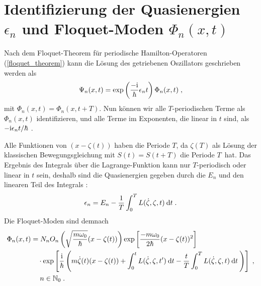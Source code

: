       \section{\texorpdfstring{Identifizierung der Quasienergien $\epsilon_n$ und Floquet-Moden $\Phi_n(x,t)$}{Identifizierung der Quasienergien epsilon_n und Floquet-Moden Phi_n(x,t)}}
        Nach dem Floquet-Theorem für periodische Hamilton-Operatoren (\ref{floquet_theorem}) kann die Lösung des getriebenen Oszillators geschrieben werden als
        \begin{equation}
          \Psi_n(x,t) = \exp\left(\frac{-\text i}{\hbar}\epsilon_nt\right)\Phi_n(x,t) \; ,
        \end{equation}
        mit $\Phi_n(x,t)=\Phi_n(x,t+T)$.
        Nun können wir alle $T$-periodischen Terme als $\Phi_n(x,t)$ identifizieren, und alle Terme im Exponenten, die linear in $t$ sind, als $-\text i\epsilon_n t/\hbar$ \cite{haengi}.

        Alle Funktionen von $(x-\zeta(t))$ haben die Periode $T$, da $\zeta(T)$ als Lösung der klassischen Bewegungsgleichung mit $S(t)=S(t+T)$ die Periode $T$ \,hat. Das
        Ergebnis des Integrals über die Lagrange-Funktion kann nur $T$-periodisch oder linear in $t$ sein, deshalb sind die Quasienergien gegeben durch die $E_n$ und den linearen Teil des Integrals \cite{haengi}:
        \begin{equation}
          \epsilon_n = E_n - \frac{1}{T} \int_0^T L(\dot \zeta, \zeta, t) \: \text d t \; .
          \label{ep}
        \end{equation}
        Die Floquet-Moden sind demnach
        \begin{align}
          \begin{split}
            \Phi_n(x,t) &=
             N_nO_n\left(\sqrt{\frac{m\omega_0}{\hbar}}(x-\zeta(t))\right) \exp\left[\frac{-m\omega_0}{2\hbar}(x-\zeta(t))^2\right] \\
            &\quad \cdot \exp\left[\frac{\text i}{\hbar}\left(m\dot \zeta(t)(x-\zeta(t))+\int_0^tL(\dot \zeta,\zeta,t')\:\text d t-\frac{t}{T} \int_0^T L(\dot \zeta,\zeta,t)\:\text dt\: \right)\right] \; , \notag\\
            &\quad \;n \in \mathbb{N}_0 \; .
            \label{floquet_moden_einzelner}
          \end{split}
        \end{align}


